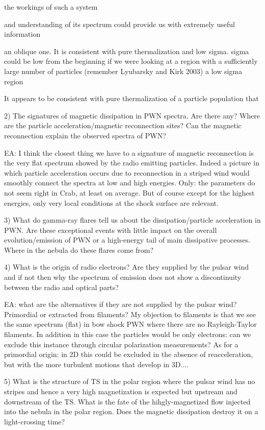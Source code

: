 the workings of such a system 

and understanding of its spectrum could provide us with extremely useful information

an oblique one. It is consistent with pure thermalization and low sigma. sigma could be low from the beginning if we were looking at a region with a sufficiently large number of particles (remember Lyubarsky and Kirk 2003) a low sigma region

It appears to be consistent with pure thermalization of a particle population that  

2) The signatures of magnetic dissipation in PWN spectra. Are there any?  Where are the particle acceleration/magnetic reconnection sites? Can the magnetic reconnection explain the observed spectra of PWN? 

EA: I think the closest thing we have to a signature of magnetic reconnection is the very flat spectrum showed by the radio emitting particles. Indeed a picture in which particle acceleration occurs due to reconnection in a striped wind would smoothly connect the spectra at low and high energies. Only: the parameters do not seem right in Crab, at least on average. But of course except for the highest energies, only very local conditions at the shock surface are relevant.

3) What do gamma-ray flares tell us about the dissipation/particle acceleration in PWN. 
Are these exceptional events with little impact on the overall evolution/emission of PWN or a high-energy tail of main dissipative processes. Where in the nebula do these flares come from? 


4) What is the origin of radio electrons? Are they supplied by the pulsar wind and if not then why the spectrum of emission does not show a discontinuity between the radio and optical parts? 

EA: what are the alternatives if they are not supplied by the pulsar wind? Primordial or extracted from filaments? My objection to filaments is that we see the same spectrum (flat) in bow shock PWN where there are no Rayleigh-Taylor filaments. In addition in this case the particles would be only electrons: can we exclude this instance through circular polarization measurements? As for a primordial origin: in 2D this could be excluded in the absence of reacceleration, but with the more turbulent motions that develop in 3D....


5) What is the structure of TS in the polar region where the pulsar wind has no stripes and hence a very high magnetization is expected but upstream and downstream of the TS. What is the fate of the hihgly-magnetized flow injected into the nebula in the polar region. Does the magnetic dissipation destroy it on a light-crossing time? 


